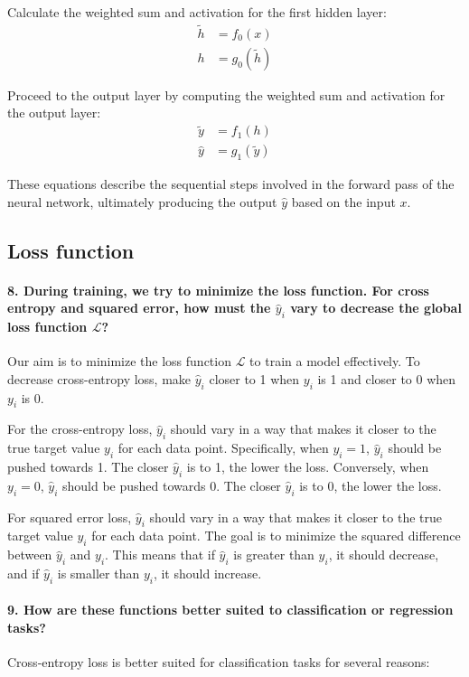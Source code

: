 Calculate the weighted sum and activation for the first hidden layer:
\begin{align*}
    \tilde{h} & = f_0(x)         \\
    h         & = g_0(\tilde{h})
\end{align*}

Proceed to the output layer by computing the weighted sum and activation for the output layer:
\begin{align*}
    \tilde{y} & = f_1(h)         \\
    \hat{y}   & = g_1(\tilde{y})
\end{align*}

These equations describe the sequential steps involved in the forward pass of the neural network, ultimately producing the output $\hat{y}$ based on the input $x$.

\subsection{Loss function}
\paragraph{8. During training, we try to minimize the loss function. For cross entropy and squared error, how must the $ \hat{y}_i $  vary to decrease the global loss function $ \mathcal{L} $?}
Our aim is to minimize the loss function $\mathcal{L}$ to train a model effectively. To decrease cross-entropy loss, make $\hat{y}_i$ closer to 1 when $y_i$ is 1 and closer to 0 when $y_i$ is 0.

For the cross-entropy loss, $\hat{y}_i$ should vary in a way that makes it closer to the true target value $y_i$ for each data point. Specifically, when $y_i = 1$, $\hat{y}_i$ should be pushed towards 1. The closer $\hat{y}_i$ is to 1, the lower the loss. Conversely, when $y_i = 0$, $\hat{y}_i$ should be pushed towards 0. The closer $\hat{y}_i$ is to 0, the lower the loss.

For squared error loss, $\hat{y}_i$ should vary in a way that makes it closer to the true target value $y_i$ for each data point. The goal is to minimize the squared difference between $\hat{y}_i$ and $y_i$. This means that if $\hat{y}_i$ is greater than $y_i$, it should decrease, and if $\hat{y}_i$ is smaller than $y_i$, it should increase.

\paragraph{9. How are these functions better suited to classification or regression tasks?}
Cross-entropy loss is better suited for classification tasks for several reasons:

